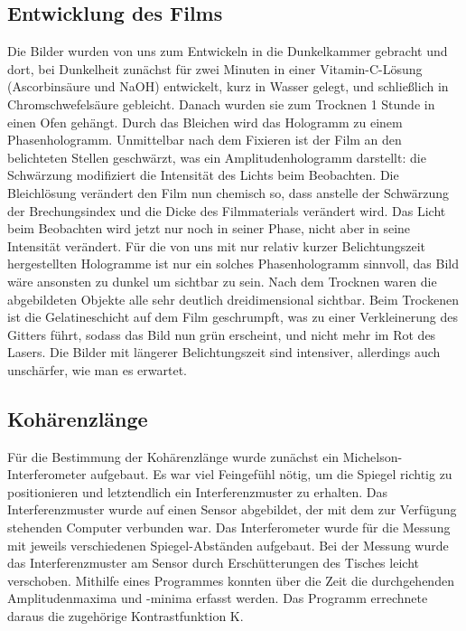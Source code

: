 \documentclass[10pt,a4paper]{article}
\begin{document}
\subsection{Entwicklung des Films}



Die Bilder wurden von uns zum Entwickeln in die Dunkelkammer gebracht und dort, bei Dunkelheit zunächst für zwei Minuten in einer Vitamin-C-Lösung (Ascorbinsäure und NaOH) entwickelt, kurz in Wasser gelegt, und schließlich in Chromschwefelsäure gebleicht. Danach wurden sie zum Trocknen 1 Stunde in einen Ofen gehängt. Durch das Bleichen wird das Hologramm zu einem Phasenhologramm. 
Unmittelbar nach dem Fixieren ist der Film an den belichteten Stellen geschwärzt, was ein Amplitudenhologramm darstellt: die Schwärzung modifiziert die Intensität des Lichts beim Beobachten. Die Bleichlösung verändert den Film nun 
chemisch so, dass anstelle der Schwärzung der Brechungsindex und die Dicke des Filmmaterials verändert wird. Das Licht beim Beobachten wird jetzt nur noch in seiner Phase, nicht aber in seine Intensität verändert. Für die von uns mit nur relativ kurzer Belichtungszeit hergestellten Hologramme ist nur ein solches Phasenhologramm sinnvoll, das Bild wäre ansonsten zu dunkel um sichtbar zu sein. Nach dem Trocknen waren die abgebildeten Objekte alle sehr deutlich dreidimensional sichtbar. Beim Trockenen ist die Gelatineschicht auf dem Film geschrumpft, was zu einer Verkleinerung des Gitters führt, sodass das Bild nun grün erscheint, und nicht mehr im Rot des Lasers. Die Bilder mit längerer Belichtungszeit sind intensiver, allerdings auch unschärfer, wie man es erwartet.

\subsection{Kohärenzlänge}

Für die Bestimmung der Kohärenzlänge wurde zunächst ein Michelson-Interferometer aufgebaut. Es war viel Feingefühl nötig, um die Spiegel richtig zu positionieren und letztendlich ein Interferenzmuster zu erhalten. Das Interferenzmuster wurde auf einen Sensor abgebildet, der mit dem zur Verfügung stehenden Computer verbunden war. Das Interferometer wurde für die Messung mit jeweils verschiedenen Spiegel-Abständen aufgebaut. Bei der Messung wurde das Interferenzmuster am Sensor durch Erschütterungen des Tisches leicht verschoben. Mithilfe eines Programmes konnten über die Zeit die durchgehenden Amplitudenmaxima und -minima erfasst werden. Das Programm errechnete daraus die zugehörige Kontrastfunktion K. 
\end{document}
